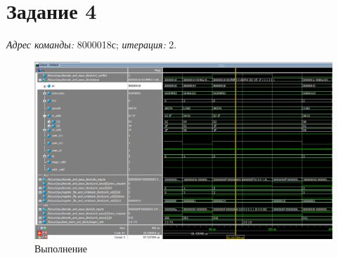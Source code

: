 \section{Задание 4}
\textit{Адрес команды: }8000018с; \textit{итерация: }2. 

\begin{figure}[ht!]
\centering
\includegraphics[width=170mm]{./img/task4.png}
\caption{Выполнение \label{overflow}}
\end{figure}
